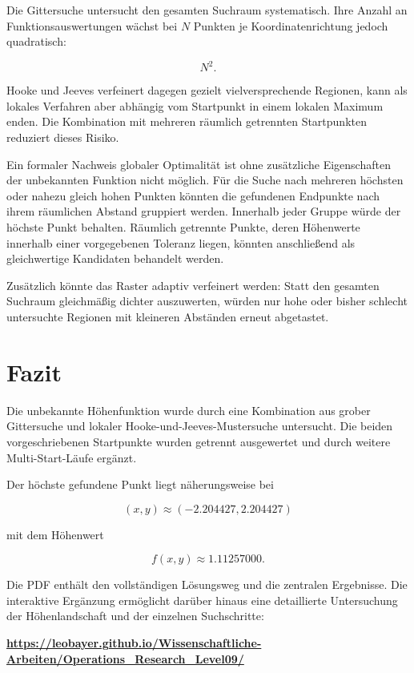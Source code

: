 \documentclass[
  ngerman,
  10pt,
  a4paper,
]{article}
\begin{document}
Die Gittersuche untersucht den gesamten Suchraum systematisch. Ihre
Anzahl an Funktionsauswertungen wächst bei \(N\) Punkten je
Koordinatenrichtung jedoch quadratisch:

\[
N^2.
\]

Hooke und Jeeves verfeinert dagegen gezielt vielversprechende Regionen,
kann als lokales Verfahren aber abhängig vom Startpunkt in einem lokalen
Maximum enden. Die Kombination mit mehreren räumlich getrennten
Startpunkten reduziert dieses Risiko.

Ein formaler Nachweis globaler Optimalität ist ohne zusätzliche
Eigenschaften der unbekannten Funktion nicht möglich. Für die Suche nach
mehreren höchsten oder nahezu gleich hohen Punkten könnten die
gefundenen Endpunkte nach ihrem räumlichen Abstand gruppiert werden.
Innerhalb jeder Gruppe würde der höchste Punkt behalten. Räumlich
getrennte Punkte, deren Höhenwerte innerhalb einer vorgegebenen Toleranz
liegen, könnten anschließend als gleichwertige Kandidaten behandelt
werden.

Zusätzlich könnte das Raster adaptiv verfeinert werden: Statt den
gesamten Suchraum gleichmäßig dichter auszuwerten, würden nur hohe oder
bisher schlecht untersuchte Regionen mit kleineren Abständen erneut
abgetastet.

\section{Fazit}\label{fazit}

Die unbekannte Höhenfunktion wurde durch eine Kombination aus grober
Gittersuche und lokaler Hooke-und-Jeeves-Mustersuche untersucht. Die
beiden vorgeschriebenen Startpunkte wurden getrennt ausgewertet und
durch weitere Multi-Start-Läufe ergänzt.

\protect{}\label{final-result}
Der höchste gefundene Punkt liegt näherungsweise bei

\[
\boxed{(x,y)\approx(-2.204427,2.204427)}
\]

mit dem Höhenwert

\[
\boxed{f(x,y)\approx 1.11257000}.
\]

Die PDF enthält den vollständigen Lösungsweg und die zentralen
Ergebnisse. Die interaktive Ergänzung ermöglicht darüber hinaus eine
detaillierte Untersuchung der Höhenlandschaft und der einzelnen
Suchschritte:

\href{https://leobayer.github.io/Wissenschaftliche-Arbeiten/Operations_Research_Level09/}{\textbf{https://leobayer.github.io/Wissenschaftliche-Arbeiten/Operations\_Research\_Level09/}}
\end{document}
